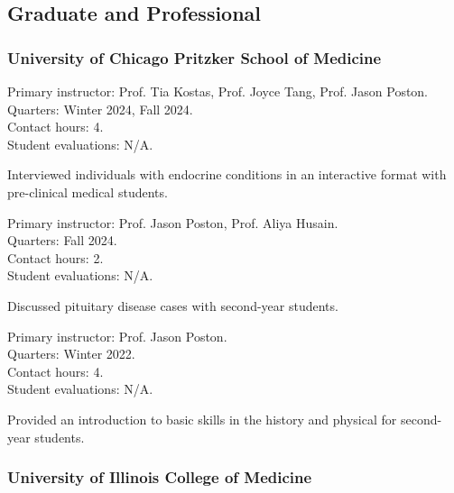 \documentclass[%
DIV=19,
]{komacv}
\begin{document}

\begin{longcv}

\subsection{Graduate and Professional}

\subsubsection{University of Chicago Pritzker School of Medicine}

{Primary instructor: Prof. Tia Kostas, Prof. Joyce Tang, Prof. Jason Poston.\\
Quarters: Winter 2024, Fall 2024.\\
Contact hours: 4.\\
Student evaluations: N/A.
\begin{compactitem}
\item Interviewed individuals with endocrine conditions in an interactive format with pre-clinical medical students.
\end{compactitem}}

{Primary instructor: Prof. Jason Poston, Prof. Aliya Husain.\\
Quarters: Fall 2024.\\
Contact hours: 2.\\
Student evaluations: N/A.
\begin{compactitem}
\item Discussed pituitary disease cases with second-year students.
\end{compactitem}}

{Primary instructor: Prof. Jason Poston.\\
Quarters: Winter 2022.\\
Contact hours: 4.\\
Student evaluations: N/A.
\begin{compactitem}
\item Provided an introduction to basic skills in the history and physical for second-year students.
\end{compactitem}}

\subsubsection{University of Illinois College of Medicine}


\end{longcv}
\end{document}
